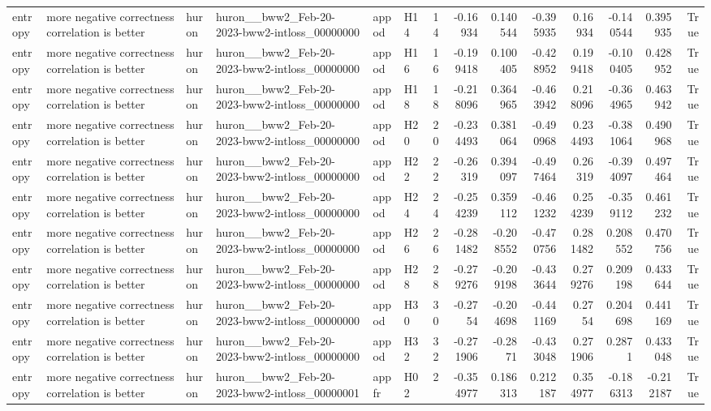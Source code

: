 \begin{longtable}{llllllrrrrrrrr}
entropy & more negative correctness correlation is better & huron & huron\_\_bww2\_Feb-20-2023-bww2-intloss\_00000000 & appod & H14 & 14 & -0.16934 & 0.140544 & -0.395935 & 0.16934 & -0.140544 & 0.395935 & True \\
entropy & more negative correctness correlation is better & huron & huron\_\_bww2\_Feb-20-2023-bww2-intloss\_00000000 & appod & H16 & 16 & -0.199418 & 0.100405 & -0.428952 & 0.199418 & -0.100405 & 0.428952 & True \\
entropy & more negative correctness correlation is better & huron & huron\_\_bww2\_Feb-20-2023-bww2-intloss\_00000000 & appod & H18 & 18 & -0.218096 & 0.364965 & -0.463942 & 0.218096 & -0.364965 & 0.463942 & True \\
entropy & more negative correctness correlation is better & huron & huron\_\_bww2\_Feb-20-2023-bww2-intloss\_00000000 & appod & H20 & 20 & -0.234493 & 0.381064 & -0.490968 & 0.234493 & -0.381064 & 0.490968 & True \\
entropy & more negative correctness correlation is better & huron & huron\_\_bww2\_Feb-20-2023-bww2-intloss\_00000000 & appod & H22 & 22 & -0.26319 & 0.394097 & -0.497464 & 0.26319 & -0.394097 & 0.497464 & True \\
entropy & more negative correctness correlation is better & huron & huron\_\_bww2\_Feb-20-2023-bww2-intloss\_00000000 & appod & H24 & 24 & -0.254239 & 0.359112 & -0.461232 & 0.254239 & -0.359112 & 0.461232 & True \\
entropy & more negative correctness correlation is better & huron & huron\_\_bww2\_Feb-20-2023-bww2-intloss\_00000000 & appod & H26 & 26 & -0.281482 & -0.208552 & -0.470756 & 0.281482 & 0.208552 & 0.470756 & True \\
entropy & more negative correctness correlation is better & huron & huron\_\_bww2\_Feb-20-2023-bww2-intloss\_00000000 & appod & H28 & 28 & -0.279276 & -0.209198 & -0.433644 & 0.279276 & 0.209198 & 0.433644 & True \\
entropy & more negative correctness correlation is better & huron & huron\_\_bww2\_Feb-20-2023-bww2-intloss\_00000000 & appod & H30 & 30 & -0.2754 & -0.204698 & -0.441169 & 0.2754 & 0.204698 & 0.441169 & True \\
entropy & more negative correctness correlation is better & huron & huron\_\_bww2\_Feb-20-2023-bww2-intloss\_00000000 & appod & H32 & 32 & -0.271906 & -0.2871 & -0.433048 & 0.271906 & 0.2871 & 0.433048 & True \\
entropy & more negative correctness correlation is better & huron & huron\_\_bww2\_Feb-20-2023-bww2-intloss\_00000001 & appfr & H02 & 2 & -0.354977 & 0.186313 & 0.212187 & 0.354977 & -0.186313 & -0.212187 & True \\

\end{longtable}

